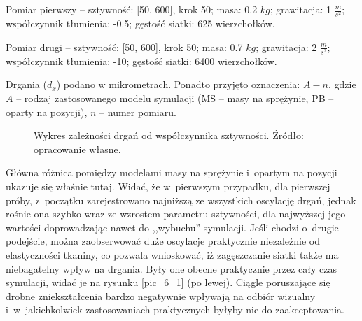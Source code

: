 		Pomiar pierwszy -- sztywność: [50, 600], krok 50; masa: 0.2 \(kg\); grawitacja: 1 \(\frac{m}{s^2}\); współczynnik tłumienia: -0.5; gęstość siatki: 625 wierzchołków.
		
		Pomiar drugi -- sztywność: [50, 600], krok 50; masa: 0.7 \(kg\); grawitacja: 2 \(\frac{m}{s^2}\); współczynnik tłumienia: -10; gęstość siatki: 6400 wierzchołków.
		
		Drgania (\(d_{x}\)) podano w mikrometrach. Ponadto przyjęto oznaczenia: \(A-n\), gdzie \(A\) -- rodzaj zastosowanego modelu symulacji (MS -- masy na sprężynie, PB -- oparty na pozycji), \(n\) -- numer pomiaru.
		\newline
		
		
		\begin{figure}[H]
		\caption[Wykres zależności drgań od współczynnika sztywności.]{Wykres zależności drgań od współczynnika sztywności. Źródło: opracowanie własne.}
		\label{wykr_6_2}
		\end{figure}
		\pagebreak
		
		
		Główna różnica pomiędzy modelami masy na sprężynie i~opartym na pozycji ukazuje się właśnie tutaj. Widać, że w~pierwszym przypadku, dla pierwszej próby, z~początku zarejestrowano najniższą ze wszystkich oscylację drgań, jednak rośnie ona szybko wraz ze wzrostem parametru sztywności, dla najwyższej jego wartości doprowadzając nawet do ,,wybuchu'' symulacji. Jeśli chodzi o~drugie podejście, można zaobserwować duże oscylacje praktycznie niezależnie od elastyczności tkaniny, co pozwala wnioskować, iż zagęszczanie siatki także ma niebagatelny wpływ na drgania. Były one obecne praktycznie przez cały czas symulacji, widać je na rysunku \ref{pic_6_1} (po lewej). Ciągle poruszające się drobne zniekształcenia bardzo negatywnie wpływają na odbiór wizualny i~w~jakichkolwiek zastosowaniach praktycznych byłyby nie do zaakceptowania.
		

